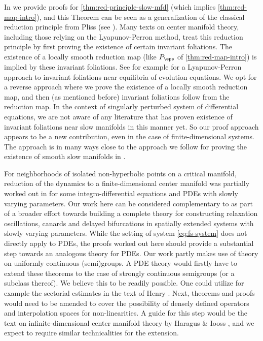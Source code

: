 \documentclass[a4paper]{siamart190516}
\begin{document}
In  we
provide proofs for \cref{thm:red-principle-slow-mfd} (which implies
\cref{thm:red-map-intro}), and this Theorem can be seen as a generalization of the
classical reduction principle from Pliss (see \cite{Ke67b}). Many texts on center
manifold theory, including those relying on the Lyapunov-Perron method, treat this
reduction principle by first proving the existence of certain invariant
foliations. The existence of a locally smooth reduction map (like $P_{\eps}$ of
\cref{thm:red-map-intro}) is implied by these invariant foliations. See for
example \cite{ChLiLu91} for a Lyapunov-Perron approach to invariant foliations near
equilibria of evolution equations. We opt for a reverse approach where we prove the
existence of a locally smooth reduction map, and then (as mentioned before) invariant
foliations follow from the reduction map. In the context of singularly perturbed
system of differential equations, we are not aware of any literature that has proven
existence of invariant foliations near slow manifolds in this manner yet. So our
proof approach appears to be a new contribution, even in the case of
finite-dimensional systems. The approach is in many ways close to the approach we
follow for proving the existence of smooth slow manifolds in
. 

For neighborhoods of isolated non-hyperbolic points on a critical manifold,
reduction of the dynamics to a finite-dimensional center manifold was partially
worked out in \cite{AvDe20} for some integro-differential equations and PDEs with 
slowly varying parameters. Our work here can be considered complementary to \cite{AvDe20}
 as part of a broader effort towards building a complete theory for constructing relaxation oscillations,
canards and delayed bifurcations in spatially extended systems with slowly varying
parameters. While the setting of system \cref{eq:fs-system} does not directly apply
to PDEs, the proofs worked out here should provide a substantial step towards an analogous
theory for PDEs. 
Our work partly makes use of theory on uniformly continuous (semi)groups. A PDE
theory would firstly have to extend these theorems to the case of strongly continuous
semigroups (or a subclass thereof). We believe this to be readily possible. One could utilize for
example the sectorial estimates in the text of Henry \cite{He81}. Next, theorems
and proofs would need to be amended to cover the possibility of densely defined operators and interpolation
spaces for non-linearities. A guide for this step  would be the text on infinite-dimensional center manifold
theory by Haragus \& Iooss \cite{HaIo10}, and we expect to require similar technicalities for the extension.
\end{document}
